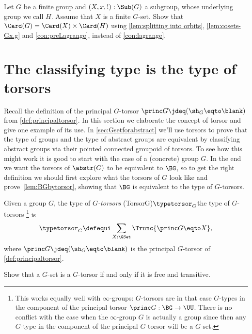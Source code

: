 \begin{xca}\label{xca:lagrange2}
Let $G$ be a finite group and $(X,x,!):\Sub(G)$ a subgroup,
whose underlying group we call $H$. 
Assume that $X$ is a finite $G$-set. Show that 
$\Card(G) = \Card(X) \times \Card(H)$ using \cref{lem:splitting into orbits},
\cref{lem:cosets-Gx.g} and \cref{con:preLagrange}, instead of
\cref{con:lagrange}.
\end{xca}


\section{The classifying type is the type of torsors}
\label{sec:torsors}
Recall the definition of the principal $G$-torsor 
$\princ G \jdeq (\sh_G \eqto \blank)$ from \cref{def:principaltorsor}.
In this section we elaborate the concept of torsor and give one example
of its use.
In \cref{sec:Gsetforabstract} we'll use torsors to prove that the type of groups and the type of abstract groups are equivalent by classifying abstract groups via their pointed connected groupoid of torsors.  To see how this might work it is good to start with the case of a (concrete) group $G$.
In the end we want the torsors of $\abstr(G)$ to be equivalent to $\BG$, so to get the right definition we should first explore what the torsors of $G$ look like and prove~\cref{lem:BGbytorsor}, showing that $\BG$ is equivalent to the type of $G$-torsors.
\begin{definition}\label{def:Gtorsor}
  Given a group $G$, the type of \emph{$G$-torsors}%
  \glossary(TorsorG){$\protect\typetorsor_G$}{the type of $G$-torsors}%
  \footnote{This works equally well with $\infty$-groups: $G$-torsors are in that case $G$-types in the component of the principal torsor $\princ G:\BG\to\UU$. There is no conflict with the case when the $\infty$-group $G$ is actually a group since then any $G$-type in the component of the principal $G$-torsor will be a $G$-set.}
  is
  \[
    \typetorsor_G\defequi\sum_{X:\GSet}\Trunc{\princ G \eqto X},
  \]
  where $\princ G \jdeq (\sh_G \eqto \blank)$ is the 
  principal $G$-torsor of \cref{def:principaltorsor}.
\end{definition}

\begin{xca}\label{xca:torsor=free+transitive}
  Show that a $G$-set is a $G$-torsor if and only if it is free and transitive.
\end{xca}

